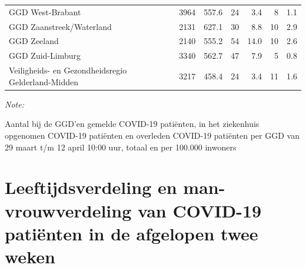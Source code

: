 \documentclass[
  english,
  man,floatsintext]{apa6}
\begin{document}
\begin{table}
\begin{threeparttable}
\begin{tabular}{lrrrrrr}
GGD West-Brabant & 3964 & 557.6 & 24 & 3.4 & 8 & 1.1\\
GGD Zaanstreek/Waterland & 2131 & 627.1 & 30 & 8.8 & 10 & 2.9\\
GGD Zeeland & 2140 & 555.2 & 54 & 14.0 & 10 & 2.6\\
GGD Zuid-Limburg & 3340 & 562.7 & 47 & 7.9 & 5 & 0.8\\
Veiligheids- en Gezondheidsregio Gelderland-Midden & 3217 & 458.4 & 24 & 3.4 & 11 & 1.6\\
\bottomrule
\end{tabular}
\begin{tablenotes}
\item \textit{Note: } 
\item Aantal bij de GGD’en gemelde COVID-19 patiënten, in het ziekenhuis opgenomen COVID-19 patiënten en overleden COVID-19 patiënten per GGD van 29 maart t/m 12 april 10:00 uur, totaal en per 100.000 inwoners
\end{tablenotes}
\end{threeparttable}
\endgroup{}
\end{table}

\newpage

\hypertarget{leeftijdsverdeling-en-man-vrouwverdeling-van-covid-19-patiuxebnten-in-de-afgelopen-twee-weken}{%
\section{Leeftijdsverdeling en man-vrouwverdeling van COVID-19 patiënten in de afgelopen twee weken}\label{leeftijdsverdeling-en-man-vrouwverdeling-van-covid-19-patiuxebnten-in-de-afgelopen-twee-weken}}
\end{document}
